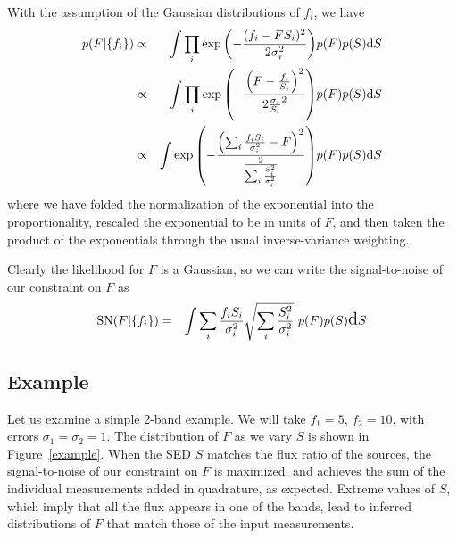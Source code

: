 \documentclass[letterpaper,preprint]{aastex}
\newcommand{\fig}{Figure}
\newcommand{\figref}[1]{\mbox{\fig~\ref{#1}}}
\begin{document}
With the assumption of the Gaussian distributions of $f_i$, we have
\begin{eqnarray}
  p(F | \setfi) &\propto& \int \prod_i \exp{\left( -\frac{(f_i - F S_i)^2}{2 \sigma_i^2} \right)} p(F) p(S) \dd S \\
  &\propto& \int \prod_i \exp{\left( -\frac{ \left( F - \frac{f_i}{S_i} \right)^2}{2 \frac{\sigma_i}{S_i}^2} \right)} p(F) p(S) \dd S \\
  &\propto& \int \exp{\left(- \frac{\left( \sum_i \frac{f_i S_i}{\sigma_i^2} - F \right)^2}%
    {\frac{2}{\sum_i \frac{S_i^2}{\sigma_i^2}}} \right)} p(F) p(S) \dd S
\end{eqnarray}
where we have folded the normalization of the exponential into the
proportionality, rescaled the exponential to be in units of $F$, and
then taken the product of the exponentials through the usual
inverse-variance weighting.

Clearly the likelihood for $F$ is a Gaussian, so we can write the
signal-to-noise of our constraint on $F$ as
\begin{eqnarray}
\textrm{SN}(F | \{ f_i \}) &=& \Large\int \sum_i \frac{f_i S_i}{\sigma_i^2} \sqrt{\sum_i \frac{S_i^2}{\sigma_i^2}} \,\, p(F) p(S) \textrm{d} S 
\end{eqnarray}

\subsection{Example}

Let us examine a simple 2-band example.  We will take $f_1 = 5$, $f_2
= 10$, with errors $\sigma_1 = \sigma_2 = 1$.  The distribution of $F$
as we vary $S$ is shown in \figref{example}.  When the SED $S$ matches
the flux ratio of the sources, the signal-to-noise of our constraint
on $F$ is maximized, and achieves the sum of the individual
measurements added in quadrature, as expected.  Extreme values of $S$,
which imply that all the flux appears in one of the bands, lead to
inferred distributions of $F$ that match those of the input
measurements.
\end{document}
